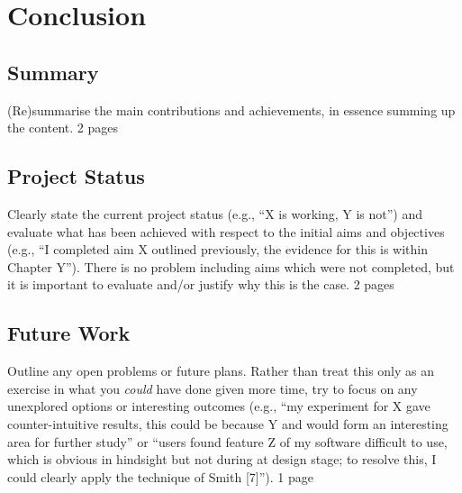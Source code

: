 \documentclass[ %
                    author={Dillon Keith Diep [INCOMPLETE DRAFT, NOT FOR SUBMISSION]},
                supervisor={Dr. Carl Henrik Ek},
                    degree={MEng},
                     title={ARt-CG:},
                  subtitle={Assisted Real-time Content Generation of 3D Hair by Learning Manifolds},
                      type={Research},
                      year={2014} ]{dissertation}
\begin{document}

\chapter{Conclusion}
\label{chap:conclusion}

\section{Summary}
(Re)summarise the main contributions and achievements, in essence
summing up the content. 2 pages

\section{Project Status}
Clearly state the current project status (e.g., ``X is working, Y 
is not'') and evaluate what has been achieved with respect to the 
initial aims and objectives (e.g., ``I completed aim X outlined 
previously, the evidence for this is within Chapter Y'').  There 
is no problem including aims which were not completed, but it is 
important to evaluate and/or justify why this is the case. 2 pages

\section{Future Work}
Outline any open problems or future plans.  Rather than treat this
only as an exercise in what you {\em could} have done given more 
time, try to focus on any unexplored options or interesting outcomes
(e.g., ``my experiment for X gave counter-intuitive results, this 
could be because Y and would form an interesting area for further 
study'' or ``users found feature Z of my software difficult to use,
which is obvious in hindsight but not during at design stage; to 
resolve this, I could clearly apply the technique of Smith [7]''). 1 page




%
%
\end{document}
